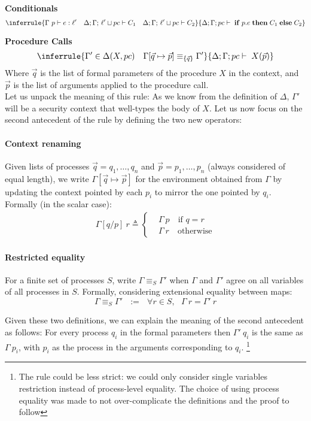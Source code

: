 \documentclass[12pt,a4paper,twoside]{book}
\begin{document}
\medskip
\noindent\textbf{Conditionals}
\[
  \inferrule
  { \Gamma~p \vdash e : \ell'
    \quad
    \Delta;\Gamma;\,\ell' \sqcup pc \vdash C_1
    \quad
    \Delta;\Gamma;\,\ell' \sqcup pc \vdash C_2 }
  {\Delta;\Gamma;pc \vdash \; \mathbf{if}\;p.e\;\mathbf{then}\;C_1\;\mathbf{else}\;C_2}
\]

\medskip
\noindent\textbf{Procedure Calls}
\[
  \inferrule
  { \Gamma' \in \Delta(X,pc) 
    \quad
    \Gamma[\vec{q}\mapsto \vec{p}] \equiv_{\{\vec{q}\}} \Gamma' }
  { \Delta;\Gamma;pc \vdash \; X(\vec{p})}
\]
Where $\vec{q}$ is the list of formal parameters of the procedure $X$ in the context, and $\vec{p}$ is the list of arguments applied to the procedure call.\\
Let us unpack the meaning of this rule:
As we know from the definition of $\Delta$, $\Gamma'$ will be a security context that well-types the body of $X$.
Let us now focus on the second antecedent of the rule by defining the two new operators:
\paragraph{Context renaming}
Given lists of processes $\vec{q} = q_1,\dots,q_n$ and $\vec{p} = p_1,\dots,p_n$ (always considered of equal length), we write
$\Gamma[\vec{q}\mapsto \vec{p}]$
for the environment obtained from $\Gamma$ by updating the context pointed by each $p_i$ to mirror the one pointed by $q_i$. Formally (in the scalar case):
\begin{align*}
	\Gamma[q/p]~r \triangleq
    \begin{cases}
    &\Gamma~p \quad \text{if $q = r$}\\
    &\Gamma~r \quad \text{otherwise}
    \end{cases}
\end{align*}
\paragraph{Restricted equality}
For a finite set of processes $S$, write $\Gamma \equiv_S \Gamma'$ when $\Gamma$ and $\Gamma'$ agree on all variables of all processes in $S$. Formally, considering extensional equality between maps:
$$ \Gamma \equiv_S \Gamma' ~~~:=~~~ \forall r \in S,~~~\Gamma~r = \Gamma'~r$$

Given these two definitions, we can explain the meaning of the second antecedent as follows: For every process $q_i$ in the formal parameters then $\Gamma'~q_i$ is the same as $\Gamma~p_i$, with $p_i$ as the process in the arguments corresponding to $q_i$. \footnote{The rule could be less strict: we could only consider single variables restriction instead of process-level equality. The choice of using process equality was made to not over-complicate the definitions and the proof to follow}
\end{document}
